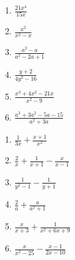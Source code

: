 \begin{exercicios}
    
    \begin{multicols}{3}{\large
        \begin{enumerate} [label=\alph*)]
            \item $\frac{21x^4}{15x}$
            
            \item $\frac{x^2}{x^2-x}$
            
            \item $\frac{a^2-a}{a^2-2a+1}$
            
            \item $\frac{y+2}{4y^2-16}$
            
            \item $\frac{x^3+4x^2-21x}{x^2-9}$
            
            \item $\frac{a^3+3a^2-5a-15}{a^2+3a}$
        \end{enumerate}
    }\end{multicols}
    
    
    \begin{multicols}{3}{\large
        \begin{enumerate} [label=\alph*)]
            \item $\frac{1}{3x} + \frac{x+1}{x^2}$
            
            \item $\frac{2}{x} + \frac{1}{x+1} - \frac{x}{x-1}$
            
            \item $\frac{1}{y^2-1} - \frac{1}{y+1}$
            
            \item $\frac{2}{a} + \frac{a}{a^2+1}$
            
            \item $\frac{x}{x+3} + \frac{1}{x^2+6x+9}$
            
            \item $\frac{x}{x^2-25} - \frac{x-1}{2x-10}$
        \end{enumerate}
    }\end{multicols}
    
    

\end{exercicios}
